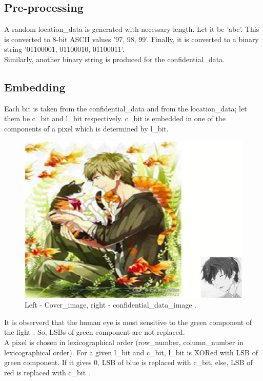 \documentclass[conference]{IEEEtran}
\begin{document}
\subsection{Pre-processing}
A random location\_data is generated with necessary length. Let it be 'abc'.
This is converted to 8-bit ASCII values '97, 98, 99'.
Finally, it is converted to a binary string '01100001, 01100010, 01100011'.\\

Similarly, another binary string is produced for the confidential\_data.\\

\subsection{Embedding}
Each bit is taken from the confidential\_data and from the location\_data;
let them be c\_bit and l\_bit respectively.
c\_bit is embedded in one of the components of a pixel which is determined by l\_bit.\\

\begin{figure}[H]
  \includegraphics[width=\linewidth]{cover_image_cum_confidential_data.png}
  \caption{Left - Cover\_image, right - confidential\_data\_image \cite{b2}.}
\end{figure}

It is observerd that the human eye is most sensitive to the green component of the light \cite{b2}.
So, LSBs of green component are not replaced.\\

A pixel is chosen in lexicographical order (row\_number, column\_number in lexicographical order).
For a given l\_bit and c\_bit, l\_bit is XORed with LSB of green component.
If it gives 0, LSB of blue is replaced with c\_bit, else, LSB of red is replaced with c\_bit \cite{b2}.\\
\end{document}
